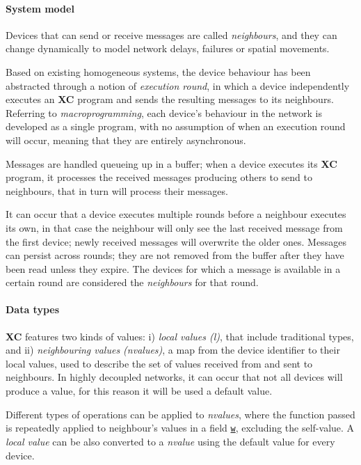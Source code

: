 
\paragraph{System model}
Devices that can send or receive messages are called \emph{neighbours}, and they can change dynamically to model network
delays, failures or spatial movements.

Based on existing homogeneous systems, the device behaviour has been abstracted through a notion of \emph{execution round},
in which a device independently executes an \textbf{XC} program and sends the resulting messages to its neighbours.
Referring to \emph{macroprogramming}, each device's behaviour in the network is developed as a single program, with no
assumption of when an execution round will occur, meaning that they are entirely asynchronous.

Messages are handled queueing up in a buffer; when a device executes its \textbf{XC} program, it processes the received
messages producing others to send to neighbours, that in turn will process their messages.

It can occur that a device executes multiple rounds before a neighbour executes its own, in that case the neighbour will
only see the last received message from the first device; newly received messages will overwrite the older ones.
Messages can persist across rounds; they are not removed from the buffer after they have been read unless they expire.
The devices for which a message is available in a certain round are considered the \emph{neighbours} for that round.

\paragraph{Data types}
\textbf{XC} features two kinds of values:
    i) \emph{local values (l)}, that include traditional types, and
    ii) \emph{neighbouring values (nvalues)}, a map from the device identifier to their local values, used to describe
        the set of values received from and sent to neighbours.
In highly decoupled networks, it can occur that not all devices will produce a value, for this reason it will be used
a default value.

Different types of operations can be applied to \emph{nvalues}, where the function passed is repeatedly applied to
neighbour's values in a field \texttt{\underline{w}}, excluding the self-value.
A \emph{local value} can be also converted to a \emph{nvalue} using the default value for every device.

